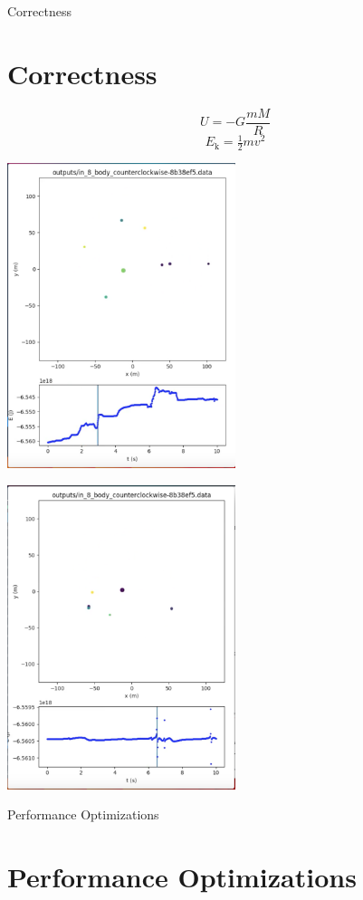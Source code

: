 \documentclass{beamer}
\begin{document}
\begin{frame}[allowframebreaks]{Correctness}
\section{Correctness}
\[
U = -G\frac {mM}{R}
\]
\[
E_\text{k} =\tfrac{1}{2} mv^2 
\]

\includegraphics[width=0.5\textwidth]{barnes_hut}

\framebreak

\includegraphics[width=0.5\textwidth]{energy_anomaly}
\end{frame}

\begin{frame}[allowframebreaks]{Performance Optimizations}
\section{Performance Optimizations}
\end{frame}
\end{document}
